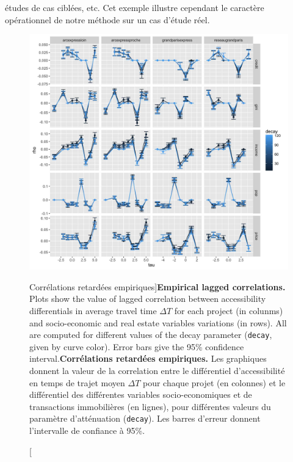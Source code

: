 {études de cas ciblées, etc. Cet exemple illustre cependant le caractère opérationnel de notre méthode sur un cas d'étude réel.
}


\begin{figure}[h!]
\includegraphics[width=\textwidth]{Figures/Final/1-2-1-fig-casestudies-empiricalres.jpg}
\caption[][Corrélations retardées empiriques]{\textbf{Empirical lagged correlations.} Plots show the value of lagged correlation between accessibility differentials in average travel time $\Delta T$ for each project (in colunms) and socio-economic and real estate variables variations (in rows). All are computed for different values of the decay parameter (\texttt{decay}, given by curve color). Error bars give the 95\% confidence interval.\label{fig:empiricalres}}{\textbf{Corrélations retardées empiriques.} Les graphiques donnent la valeur de la correlation entre le différentiel d'accessibilité en temps de trajet moyen $\Delta T$ pour chaque projet (en colonnes) et le différentiel des différentes variables socio-economiques et de transactions immobilières (en lignes), pour différentes valeurs du paramètre d'atténuation (\texttt{decay}). Les barres d'erreur donnent l'intervalle de confiance à 95\%.\label{fig:casestudies:empiricalres}}
\end{figure}
















